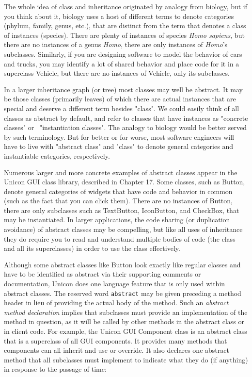 The whole idea of class and inheritance originated by analogy from
biology, but if you think about it, biology uses a host of different
terms to denote categories (phylum, family, genus, etc.), that are
distinct from the term that denotes a class of instances (species).
There are plenty of instances of species \textit{Homo sapiens}, but
there are no instances of a genus \textit{Homo}, there are only
instances of \textit{Homo}'s subclasses. Similarly, if
you are designing software to model the behavior of cars and trucks,
you may identify a lot of shared behavior and place code for it in a
superclass Vehicle, but there are no instances of Vehicle, only its
subclasses.

In a larger inheritance graph (or tree) most classes may well be
abstract. It may be those classes (primarily leaves) of which there are
actual instances that are special and deserve a different term besides
"class". We could easily think of all
classes as abstract by default, and refer to classes that have
instances as "concrete classes" or
\ "instantiation classes". The analogy to
biology would be better served by such terminology. But for better or
for worse, most software engineers will have to live with
"abstract class" and
"class" to denote general categories and
instantiable categories, respectively.

Numerous larger and more concrete examples of abstract classes appear in
the Unicon GUI class library, described in Chapter 17. Some classes,
such as Button, denote general categories of widgets that have code and
behavior in common (such as the fact that you can click them). There
are no instances of Button, there are only subclasses such as
\textsf{TextButton}, \textsf{IconButton}, and \textsf{CheckBox}, that
may be instantiated. In larger applications, the code sharing (or
duplication avoidance) of abstract classes may be compelling, but like
all uses of inheritance they do require you to read and understand
multiple bodies of code (the class and all its superclasses) in order
to use the class effectively.

Although some abstract classes like Button look exactly like regular
classes and have to be identified as abstract via their supporting
comments or documentation, Unicon does one language feature that is
only used within abstract classes. The reserved word
\texttt{abstract} may be given preceding a method header in lieu of
providing the actual body of the method. Such an \textit{abstract
method declaration} implies that subclasses must provide an
implementation of the method in question, as it will be called by
other methods in the abstract class or in client code.
For example, the Unicon GUI Component class is an abstract class
that is a superclass of all GUI components. It provides many methods
that components can all inherit and use or override. It also declares
one abstract method that all subclasses must implement to indicate
what they do (if anything) in response to the passage of time:

